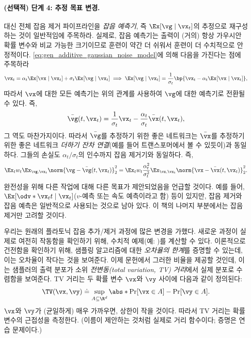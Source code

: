 \documentclass[../../book-main_ko.tex]{subfiles}
\begin{document}
\paragraph{(선택적) 단계 4: 추정 목표 변경.} 대신 전체 잡음 제거 파이프라인을 \textit{잡음 예측기}, 즉 \(\Ex[\vg \mid \vx_{t}]\)의 추정으로 재구성하는 것이 일반적임에 주목하라. 실제로, 잡음 예측기는 출력이 (거의) 항상 가우시안 확률 변수와 비교 가능한 크기이므로 훈련이 약간 더 쉬워서 훈련이 더 수치적으로 안정적이다. \eqref{eq:gen_additive_gaussian_noise_model}에 의해 다음을 가진다는 점에 주목하라
\begin{equation}
	\vx_{t} = \alpha_{t}\Ex[\vx \mid \vx_{t}] + \sigma_{t}\Ex[\vg \mid \vx_{t}] \implies \Ex[\vg \mid \vx_{t}] = \frac{1}{\sigma_{t}}\bp{\vx_{t} - \alpha_{t}\Ex[\vx \mid \vx_{t}]},
\end{equation}
따라서 \(\vx\)에 대한 모든 예측기는 위의 관계를 사용하여 \(\vg\)에 대한 예측기로 전환될 수 있다. 즉,
\begin{equation}
	\bar{\vg}(t, \vx_{t}) = \frac{1}{\sigma_{t}}\vx_{t} - \frac{\alpha_{t}}{\sigma_{t}}\bar{\vx}(t, \vx_{t}),
\end{equation}
그 역도 마찬가지이다. 따라서 \(\bar{\vg}\)를 추정하기 위한 좋은 네트워크는 \(\bar{\vx}\)를 추정하기 위한 좋은 네트워크 \textit{더하기 잔차 연결}(예를 들어 트랜스포머에서 볼 수 있듯이)과 동일하다. 그들의 손실도 \(\alpha_{t}/\sigma_{t}\)의 인수까지 잡음 제거기와 동일하다. 즉,
\begin{equation}
	\Ex_{t}w_{t}\Ex_{\vg, \vx_{t}}\norm{\vg - \bar{\vg}(t, \vx_{t})}_{2}^{2} = \Ex_{t}w_{t}\frac{\alpha_{t}^{2}}{\sigma_{t}^{2}}\Ex_{\vx, \vx_{t}}\norm{\vx - \bar{\vx}(t, \vx_{t})}_{2}^{2}.
\end{equation}
완전성을 위해 다른 작업에 대해 다른 목표가 제안되었음을 언급할 것이다. 예를 들어, \(\Ex[\odv*{\vx_{t}}{t} \mid \vx_{t}]\)(\(v\)-예측 또는 속도 예측이라고 함) 등이 있지만, 잡음 제거와 잡음 예측은 일반적으로 사용되는 것으로 남아 있다. 이 책의 나머지 부분에서는 잡음 제거만 고려할 것이다.


우리는 원래의 플라토닉 잡음 추가/제거 과정에 많은 변경을 가했다. 새로운 과정이 실제로 여전히 작동함을 확인하기 위해, 수치적 예제(예: )를 계산할 수 있다. 이론적으로 건전함을 확인하기 위해, 샘플링 알고리즘에 대한 \textit{오차율의 한계}를 증명할 수 있는데, 이는 오차율이 작다는 것을 보여준다. 이제 문헌에서 그러한 비율을 제공할 것인데, 이는 샘플러의 출력 분포가 소위 \textit{전변동(total variation, TV) 거리}에서 실제 분포로 수렴함을 보여준다. TV 거리는 두 확률 변수 \(\vx\)와 \(\vy\) 사이에 다음과 같이 정의된다:
\begin{equation}
	\TV(\vx, \vy) \doteq \sup_{A \subseteq \R^{d}}\abs*{\Pr[\vx \in A] - \Pr[\vy \in A]}.
\end{equation}
\(\vx\)와 \(\vy\)가 (균일하게) 매우 가까우면, 상한이 작을 것이다. 따라서 TV 거리는 확률 변수의 근접성을 측정한다. (이름이 제안하는 것처럼 실제로 거리 함수이다; 증명은 연습 문제이다.)
\end{document}
